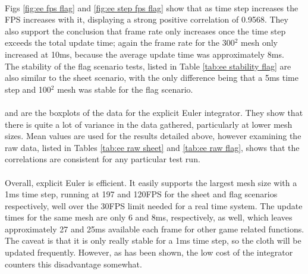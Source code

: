 \\Figs \ref{fig:ee fps flag} and \ref{fig:ee step fps flag} show that as time step increases the FPS increases with it, displaying a strong positive correlation of 0.9568. They also support the conclusion that frame rate only increases once the time step exceeds the total update time; again the frame rate for the 300$^{2}$ mesh only increased at 10ms, because the average update time was approximately 8ms.
\\The stability of the flag scenario tests, listed in Table \ref{tab:ee stability flag} are also similar to the sheet scenario, with the only difference being that a 5ms time step and 100$^{2}$ mesh was stable for the flag scenario.
\\\\ and  are the boxplots of the data for the explicit Euler integrator. They show that there is quite a lot of variance in the data gathered, particularly at lower mesh sizes. Mean values are used for the results detailed above, however examining the raw data, listed in Tables \ref{tab:ee raw sheet} and \ref{tab:ee raw flag}, shows that the correlations are consistent for any particular test run.
\\\\Overall, explicit Euler is efficient. It easily supports the largest mesh size with a 1ms time step, running at 197 and 120FPS for the sheet and flag scenarios respectively, well over the 30FPS limit needed for a real time system. The update times for the same mesh are only 6 and 8ms, respectively, as well, which leaves approximately 27 and 25ms available each frame for other game related functions. The caveat is that it is only really stable for a 1ms time step, so the cloth will be updated frequently. However, as has been shown, the low cost of the integrator counters this disadvantage somewhat.

